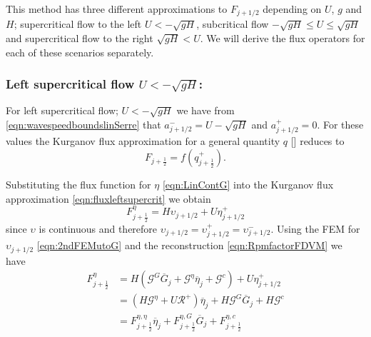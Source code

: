 This method has three different approximations to $F_{j+1/2}$ depending on $U$, $g$ and $H$;  supercritical flow to the left $U < - \sqrt{gH}$, subcritical flow $-\sqrt{gH} \le U \le \sqrt{gH}$ and supercritical flow to the right $\sqrt{gH} < U$. We will derive the flux operators for each of these scenarios separately.

\subsubsection{Left supercritical flow $U < - \sqrt{gH}$:}
For left supercritical flow; $U < - \sqrt{gH}$  we have from \eqref{eqn:wavespeedboundslinSerre} that $a^-_{j+ 1/2} = U - \sqrt{g H}$ and $a^+_{j+ 1/2} =  0$. For these values the Kurganov flux approximation for a general quantity $q$ [] reduces to 
\begin{equation}
F_{j+\frac{1}{2}} = f\left(q^+_{j+\frac{1}{2}}\right).
\label{eqn:fluxleftsupercrit}
\end{equation}

Substituting the flux function for $\eta$ \eqref{eqn:LinContG} into the Kurganov flux approximation \eqref{eqn:fluxleftsupercrit} we obtain
\begin{equation*}
F^\eta_{j+\frac{1}{2}} = H \upsilon_{j+1/2} + U \eta^+_{j+1/2}
\end{equation*}
since $\upsilon$ is continuous and therefore $\upsilon_{j+1/2} = \upsilon_{j+1/2}^+ = \upsilon_{j+1/2}^- $. Using the FEM for $\upsilon_{j+1/2}$ \eqref{eqn:2ndFEMutoG} and the reconstruction \eqref{eqn:RpmfactorFDVM} we have
\begin{align}
F^\eta_{j+\frac{1}{2}} &= H \left(\mathcal{G}^G \overline{G}_{j} + \mathcal{G}^{\eta} \overline{\eta}_{j} + \mathcal{G}^c\right) + U \eta^+_{j+1/2} \nonumber \\ &= \left(H \mathcal{G}^{\eta} + U \mathcal{R}^+ \right)  \overline{\eta}_{j} + H \mathcal{G}^G \overline{G}_{j} + H\mathcal{G}^c \nonumber \\
&= F^{\eta, \eta}_{j+\frac{1}{2}} \overline{\eta}_{j} + F^{\eta, G}_{j+\frac{1}{2}} \overline{G}_{j} + F^{\eta, c}_{j+\frac{1}{2}}
\label{eqn:Fluxfactorsupercritetaleft}
\end{align}

